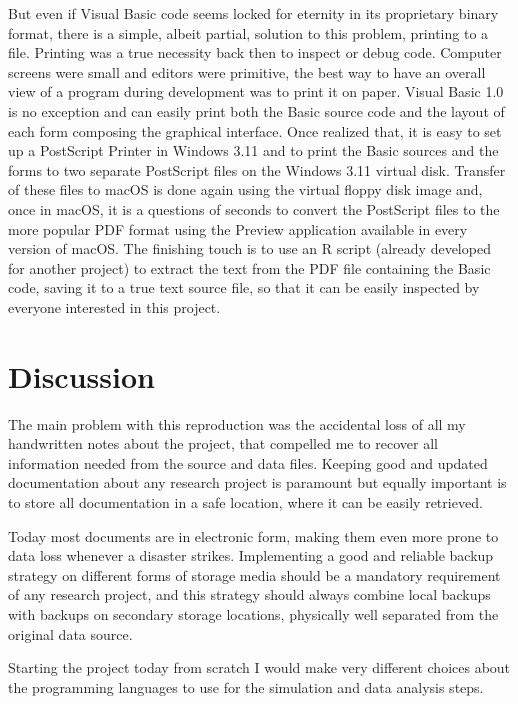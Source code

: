 But even if Visual Basic code seems locked for eternity in its proprietary binary format, there is a simple, albeit partial, solution to this problem, printing to a file. 
Printing was a true necessity back then to inspect or debug code. Computer screens were small and editors were primitive, the best way to have an overall view of a program during development was to print it on paper. Visual Basic 1.0 is no exception and can easily print both the Basic source code and the layout of each form composing the graphical interface. 
Once realized that, it is easy to set up a PostScript Printer in Windows 3.11 and to print the Basic sources and the forms to two separate PostScript files on the Windows 3.11 virtual disk. 
Transfer of these files to macOS is done again using the virtual floppy disk image and, once in macOS, it is a questions of seconds to convert the PostScript files to the more popular PDF format using the Preview application available in every version of macOS. 
The finishing touch is to use an R script (already developed for another project) to extract the text from the PDF file containing the Basic code, saving it to a true text source file, so that it can be easily inspected by everyone interested in this project.



\section{Discussion}

The main problem with this reproduction was the accidental loss of all my handwritten notes about the project, that compelled me to recover all information needed from the source and data files. 
Keeping good and updated documentation about any research project is paramount but equally important is to store all documentation in a safe location, where it can be easily retrieved.

Today most documents are in electronic form, making them even more prone to data loss whenever a disaster strikes.
Implementing a good and reliable backup strategy on different forms of storage media should be a mandatory requirement of any research project, and this strategy should always combine local backups with backups on secondary storage locations, physically well separated from the original data source. 

Starting the project today from scratch I would make very different choices about the programming languages to use for the simulation and data analysis steps.

